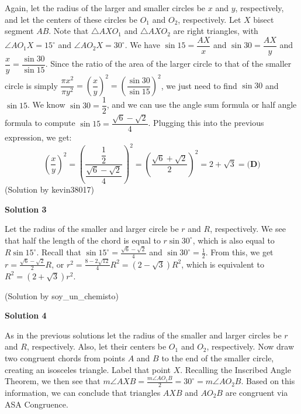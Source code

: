 \begin{enumerate}
Again, let the radius of the larger and smaller circles be $x$ and $y$, respectively, and let the centers of these circles be $O_1$ and $O_2$, respectively.  Let $X$ bisect segment $AB$.  Note that $\triangle AXO_1$ and $\triangle AXO_2$ are right triangles, with $\angle AO_1X=15^{\circ}$ and $\angle AO_2X=30^{\circ}$.  We have $\sin{15} = \dfrac{AX}{x}$ and $\sin{30} = \dfrac{AX}{y}$  and $\dfrac{x}{y} = \dfrac{\sin{30}}{\sin{15}}$. Since the ratio of the area of the larger circle to that of the smaller circle is simply $\dfrac{\pi x^2}{\pi y^2} = \left(\dfrac{x}{y} \right)^2 = \left(\dfrac{\sin{30}}{\sin{15}} \right)^2$, we just need to find $\sin{30}$ and $\sin{15}$. We know $\sin{30} = \dfrac{1}{2}$, and we can use the angle sum formula or half angle formula to compute $\sin{15} = \dfrac{\sqrt{6} - \sqrt{2}}{4}$. Plugging this into the previous expression, we get: 
 \[\left(\dfrac {x}{y} \right)^2 = \left(\dfrac{\dfrac{1}{2}}{\dfrac{\sqrt{6} - \sqrt{2}}{4}} \right)^2 = \left(\dfrac{\sqrt{6} + \sqrt{2}}{2} \right)^2 = 2 + \sqrt{3} =\boxed{\textbf{(D)}}\](Solution by kevin38017)

 



\textbf{Solution 3}

Let the radius of the smaller and larger circle be $r$ and $R$, respectively. We see that half the length of the chord is equal to $r \sin 30^{\circ}$, which is also equal to $R \sin 15^{\circ}$. Recall that $\sin 15^{\circ} = \frac{\sqrt{6} - \sqrt{2}}{4}$ and $\sin 30^{\circ} = \frac{1}{2}$. From this, we get $r = \frac{\sqrt{6} - \sqrt{2}}{2} R$, or $r^2 = \frac{8 - 2 \sqrt{12}}{4} R^2 = \left(2 - \sqrt{3}\right) R^2$, which is equivalent to $R^2 = \left(2 + \sqrt{3}\right) r^2$.

 (Solution by soy\_un\_chemisto)

 



\textbf{Solution 4}

As in the previous solutions let the radius of the smaller and larger circles be $r$ and $R$, respectively. Also, let their centers be $O_1$ and $O_2$, respectively. Now draw two congruent chords from points $A$ and $B$ to the end of the smaller circle, creating an isosceles triangle. Label that point $X$. Recalling the Inscribed Angle Theorem, we then see that $m\angle AXB = \frac{m\angle AO_1B}{2} = 30^{\circ}= m\angle AO_2B$. Based on this information, we can conclude that triangles $AXB$ and  $AO_2B$ are congruent via ASA Congruence.


\end{enumerate}
